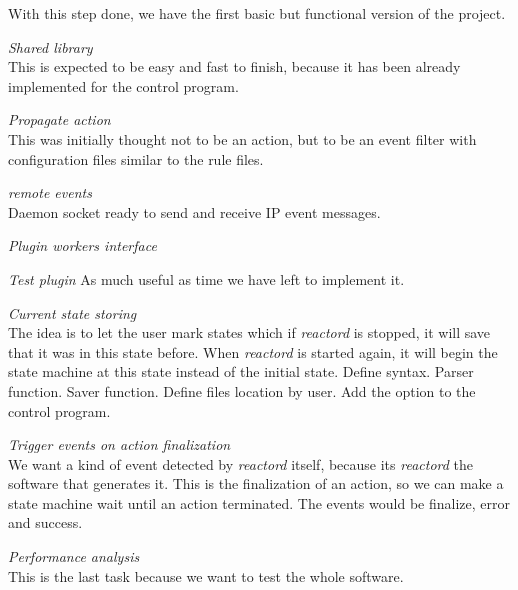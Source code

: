 With this step done, we have the first basic but functional version of the 
project.\\
\begin{list}{-}{March 16th, 2012 ({\bf 7 days})}
  \item \emph{Shared library}\\
    This is expected to be easy and fast to finish, because it has been already implemented for the control program.
\end{list}
\begin{list}{-}{March 30th, 2012 ({\bf 14 days})}
  \item \emph{Propagate action}\\
    This was initially thought not to be an action, but to be an event filter with configuration files similar to the rule files.
\end{list}
\begin{list}{-}{April 13th, 2012 ({\bf 14 days})}
  \item \emph{remote events}\\
    Daemon socket ready to send and receive IP event messages.
  \item \emph{Plugin workers interface}
\end{list}
\begin{list}{-}{April 27th, 2012 ({\bf 14 days})}
  \item \emph{Test plugin}
    \subitem As much useful as time we have left to implement it.
  \item \emph{Current state storing}\\
    The idea is to let the user mark states which if \emph{reactord} is stopped, it will save that it was in this state before. When 
    \emph{reactord} is started again, it will begin the state machine at this state instead of the initial state.
    \subitem Define syntax.
    \subitem Parser function.
    \subitem Saver function.
    \subitem Define files location by user.
    \subitem Add the option to the control program.
  \item \emph{Trigger events on action finalization}\\
    We want a kind of event detected by \emph{reactord} itself, because its \emph{reactord} the software that generates it.
    This is the finalization of an action, so we can make a state machine wait until an action terminated. The events would be 
    finalize, error and success.
  \item \emph{Performance analysis}\\
    This is the last task because we want to test the whole software.
\end{list}
